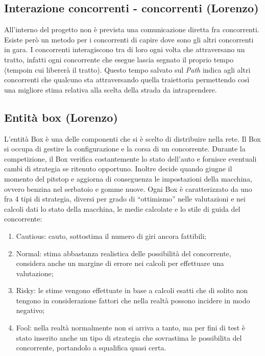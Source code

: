 \subsection{Interazione concorrenti - concorrenti (Lorenzo)}
All'interno del progetto non è prevista una comunicazione diretta fra concorrenti. Esiste però un metodo per i concorrenti di capire dove sono gli altri concorrenti in gara. I concorrenti interagiscono tra di loro ogni volta che attraversano un tratto, infatti ogni concorrente che esegue lascia segnato il proprio tempo (tempoin cui libererà il tratto). Questo tempo salvato sul \emph{Path} indica agli altri concorrenti che qualcuno sta attraversando quella traiettoria permettendo così una migliore stima relativa alla scelta della strada da intraprendere.
\subsection{Entità box (Lorenzo)}
L'entità Box è una delle componenti che si è scelto di distribuire nella rete. Il Box si occupa di gestire la configurazione e la corsa di un concorrente. Durante la competizione, il Box verifica costantemente lo stato dell'auto e fornisce eventuali cambi di strategia se ritenuto opportuno. Inoltre decide quando giugne il momento del pitstop e aggiorna di conseguenza le impostazioni della macchina, ovvero benzina nel serbatoio e gomme nuove. Ogni Box è caratterizzato da uno fra 4 tipi di strategia, diversi per grado di ``ottimismo'' nelle valutazioni e nei calcoli dati lo stato della macchina, le medie calcolate e lo stile di guida del concorrente:
\begin{enumerate}
\item Cautious: cauto, sottostima il numero di giri ancora fattibili;
\item Normal: stima abbastanza realistica delle possibilità del concorrente, considera anche un margine di errore nei calcoli per effettuare una valutazione;
\item Risky: le stime vengono effettuate in base a calcoli esatti che di solito non tengono in considerazione fattori che nella realtà possono incidere in modo negativo;
\item Fool: nella realtà normalmente non si arriva a tanto, ma per fini di test è stato inserito anche un tipo di strategia che sovrastima le possibilita del concorrente, portandolo a squalifica quasi certa.
\end{enumerate}
